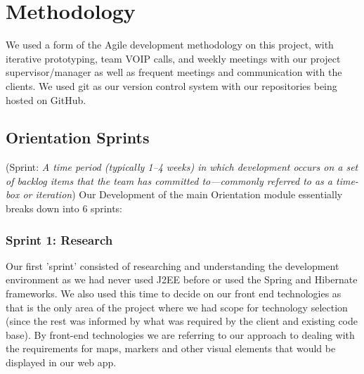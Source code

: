 \chapter{Methodology}
We used a form of the Agile development methodology on this project, with iterative prototyping, team VOIP calls, and weekly meetings with our project supervisor/manager as well as frequent meetings and communication with the clients. We used git as our version control system with our repositories being hosted on GitHub.

\section{Orientation Sprints}
(Sprint: \emph{A time period (typically 1–4 weeks) in which development occurs on a set of backlog items that the team has committed to—commonly referred to as a time-box or iteration}) 
Our Development of the main Orientation module essentially breaks down into 6 sprints:

\subsection{Sprint  1: Research}
Our first 'sprint' consisted of researching and understanding the development environment as we had never used J2EE before or used the Spring and Hibernate frameworks. We also used this time to decide on our front end technologies as that is the only area of the project where we had scope for technology selection (since the rest was informed by what was required by the client and existing code base). By front-end technologies we are referring to our approach to dealing with the requirements for maps, markers and other visual elements that would be displayed in our web app.\newline

